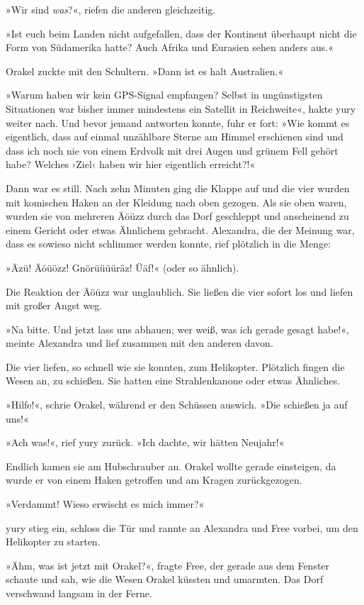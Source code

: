 »Wir sind \textit{was}?«, riefen die anderen gleichzeitig.

»Ist euch beim Landen nicht aufgefallen, dass der Kontinent überhaupt nicht die Form von Südamerika hatte? Auch Afrika und Eurasien sehen anders aus.«

Orakel zuckte mit den Schultern. »Dann ist es halt Australien.«

»Warum haben wir kein GPS-Signal empfangen? Selbst in ungünstigsten Situationen war bisher immer mindestens ein Satellit in Reichweite«, hakte yury weiter nach. Und bevor jemand antworten konnte, fuhr er fort: »Wie kommt es eigentlich, dass auf einmal unzählbare Sterne am Himmel erschienen sind und dass ich noch nie von einem Erdvolk mit drei Augen und grünem Fell gehört habe? Welches ›Ziel‹ haben wir hier eigentlich erreicht?!«

Dann war es still. Nach zehn Minuten ging die Klappe auf und die vier wurden mit komischen Haken an der Kleidung nach oben gezogen. Als sie oben waren, wurden sie von mehreren Äöüzz durch das Dorf geschleppt und anscheinend zu einem Gericht oder etwas Ähnlichem gebracht. Alexandra, die der Meinung war, dass es sowieso nicht schlimmer werden konnte, rief plötzlich in die Menge:

»Äzü! Äöüözz! Gnörüüüüräz! Üäf!« (oder so ähnlich).

Die Reaktion der Äöüzz war unglaublich. Sie ließen die vier sofort los und liefen mit großer Angst weg.

»Na bitte. Und jetzt lass uns abhauen; wer weiß, was ich gerade gesagt habe!«, meinte Alexandra und lief zusammen mit den anderen davon.

Die vier liefen, so schnell wie sie konnten, zum Helikopter. Plötzlich fingen die Wesen an, zu schießen. Sie hatten eine Strahlenkanone oder etwas Ähnliches.

»Hilfe!«, schrie Orakel, während er den Schüssen auswich. »Die schießen ja auf uns!«

»Ach was!«, rief yury zurück. »Ich dachte, wir hätten Neujahr!«

Endlich kamen sie am Hubschrauber an. Orakel wollte gerade einsteigen, da wurde er von einem Haken getroffen und am Kragen zurückgezogen.

»Verdammt! Wieso erwischt es mich immer?«

yury stieg ein, schloss die Tür und rannte an Alexandra und Free vorbei, um den Helikopter zu starten.

»Ähm, was ist jetzt mit Orakel?«, fragte Free, der gerade aus dem Fenster schaute und sah, wie die Wesen Orakel küssten und umarmten. Das Dorf verschwand langsam in der Ferne.

